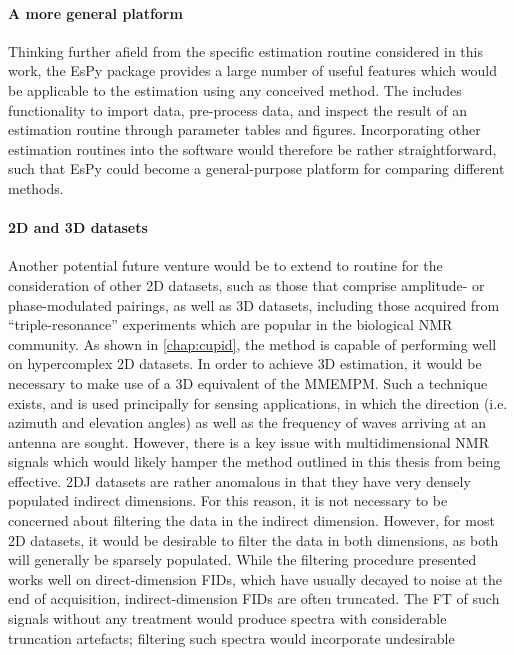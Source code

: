 \paragraph{A more general platform}
Thinking further afield from the specific estimation routine considered in this
work, the \ac{EsPy} package provides a large number of useful features which
would be applicable to the estimation using any conceived method. The includes
functionality to import data, pre-process data, and inspect the result of an
estimation routine through parameter tables and figures.
Incorporating other estimation routines into the software would therefore be
rather straightforward, such that \ac{EsPy} could become a general-purpose
platform for comparing different methods.

\paragraph{\ac{2D} and \ac{3D} datasets}
Another potential future venture would be to extend to routine for the
consideration of other \ac{2D} datasets, such as those that comprise
amplitude- or phase-modulated pairings, as well as \ac{3D} datasets,
including those acquired from ``triple-resonance'' experiments which are
popular in the biological \ac{NMR} community\cite[Section 7.4]{Cavanagh2007}.
As shown in
\cref{chap:cupid}, the method is capable of performing well on hypercomplex
\ac{2D} datasets. In order to achieve \ac{3D} estimation, it would be necessary to
make use of a \ac{3D} equivalent of the \ac{MMEMPM}. Such a technique exists,
and is used principally for sensing applications, in which the direction (i.e.
azimuth and elevation angles) as well as the frequency of waves arriving at an
antenna are sought\cite{Yilmazer2006}. However, there is a key issue with
multidimensional \ac{NMR} signals which would likely hamper the method outlined
in this thesis from being effective. \ac{2DJ} datasets are rather anomalous in
that they have very densely populated indirect dimensions. For this reason, it
is not necessary to be concerned about filtering the data in the indirect
dimension. However, for most \ac{2D} datasets, it would be desirable to filter
the data in both dimensions, as both will generally be sparsely populated.
While the filtering procedure presented works well on direct-dimension
\acp{FID}, which have usually decayed to noise at the end
of acquisition, indirect-dimension \acp{FID} are often truncated. The \ac{FT}
of such signals without any treatment would produce spectra with considerable
truncation artefacts; filtering such spectra would incorporate undesirable
